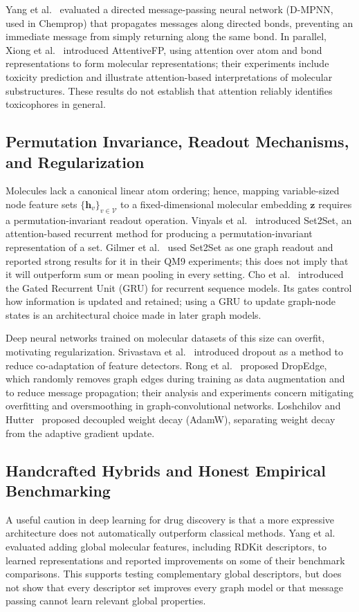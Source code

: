 Yang et al.~\cite{yang2019analyzing} evaluated a directed message-passing neural network (D-MPNN, used in Chemprop) that propagates messages along directed bonds, preventing an immediate message from simply returning along the same bond. In parallel, Xiong et al.~\cite{xiong2020pushing} introduced AttentiveFP, using attention over atom and bond representations to form molecular representations; their experiments include toxicity prediction and illustrate attention-based interpretations of molecular substructures. These results do not establish that attention reliably identifies toxicophores in general.

\subsection{Permutation Invariance, Readout Mechanisms, and Regularization}
Molecules lack a canonical linear atom ordering; hence, mapping variable-sized node feature sets $\{\mathbf{h}_v\}_{v \in \mathcal{V}}$ to a fixed-dimensional molecular embedding $\mathbf{z}$ requires a permutation-invariant readout operation. Vinyals et al.~\cite{vinyals2015order} introduced Set2Set, an attention-based recurrent method for producing a permutation-invariant representation of a set. Gilmer et al.~\cite{gilmer2017neural} used Set2Set as one graph readout and reported strong results for it in their QM9 experiments; this does not imply that it will outperform sum or mean pooling in every setting. Cho et al.~\cite{cho2014learning} introduced the Gated Recurrent Unit (GRU) for recurrent sequence models. Its gates control how information is updated and retained; using a GRU to update graph-node states is an architectural choice made in later graph models.

Deep neural networks trained on molecular datasets of this size can overfit, motivating regularization. Srivastava et al.~\cite{srivastava2014dropout} introduced dropout as a method to reduce co-adaptation of feature detectors. Rong et al.~\cite{rong2020dropedge} proposed DropEdge, which randomly removes graph edges during training as data augmentation and to reduce message propagation; their analysis and experiments concern mitigating overfitting and oversmoothing in graph-convolutional networks. Loshchilov and Hutter~\cite{loshchilov2019decoupled} proposed decoupled weight decay (AdamW), separating weight decay from the adaptive gradient update.

\subsection{Handcrafted Hybrids and Honest Empirical Benchmarking}
A useful caution in deep learning for drug discovery is that a more expressive architecture does not automatically outperform classical methods. Yang et al.~\cite{yang2019analyzing} evaluated adding global molecular features, including RDKit descriptors, to learned representations and reported improvements on some of their benchmark comparisons. This supports testing complementary global descriptors, but does not show that every descriptor set improves every graph model or that message passing cannot learn relevant global properties.

